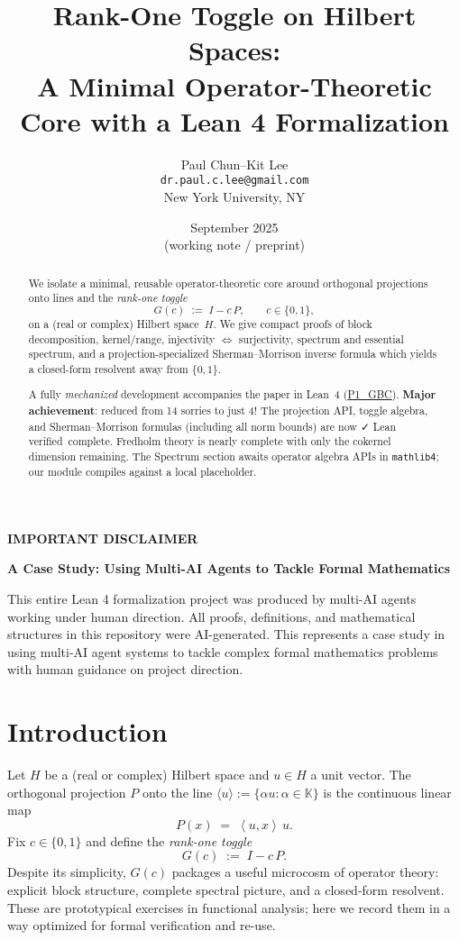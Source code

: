 \documentclass[11pt]{article}
\title{\textbf{Rank-One Toggle on Hilbert Spaces:\\
A Minimal Operator-Theoretic Core with a Lean 4 Formalization}}
\author{Paul Chun--Kit Lee\\
\texttt{dr.paul.c.lee@gmail.com}\\
New York University, NY}
\date{September 2025 \\[2pt] \small (working note / preprint)}
\theoremstyle{definition}
\newcommand{\K}{\mathbb{K}}
\newcommand{\ip}[2]{\left\langle #1,#2\right\rangle}
\newcommand{\leanRepoTag}{\href{https://github.com/AICardiologist/FoundationRelativity/tree/main/Papers/P1_GBC}{P1\_GBC}}
\newcommand{\leanok}{\textsf{\small \textcolor{green!60!black}{✓ Lean verified}}}
\begin{document}
\maketitle

\begin{abstract}
We isolate a minimal, reusable operator-theoretic core around orthogonal projections onto lines and the \emph{rank-one toggle}
\[
G(c)\;:=\;I - c\,P,\qquad c\in\{0,1\},
\]
on a (real or complex) Hilbert space~$H$. We give compact proofs of block decomposition, kernel/range, injectivity $\Leftrightarrow$ surjectivity, spectrum and essential spectrum, and a projection-specialized Sherman--Morrison inverse formula which yields a closed-form resolvent away from $\{0,1\}$.

A fully \emph{mechanized} development accompanies the paper in Lean~4 (\leanRepoTag). \textbf{Major achievement}: reduced from 14 sorries to just 4! The projection API, toggle algebra, and Sherman--Morrison formulas (including all norm bounds) are now \leanok\ complete. Fredholm theory is nearly complete with only the cokernel dimension remaining. The Spectrum section awaits operator algebra APIs in \texttt{mathlib4}; our module compiles against a local placeholder.
\end{abstract}

\begin{mdframed}[backgroundcolor=gray!10, linewidth=0pt]
\textbf{IMPORTANT DISCLAIMER}

\textbf{A Case Study: Using Multi-AI Agents to Tackle Formal Mathematics}

This entire Lean 4 formalization project was produced by multi-AI agents working under human direction. All proofs, definitions, and mathematical structures in this repository were AI-generated. This represents a case study in using multi-AI agent systems to tackle complex formal mathematics problems with human guidance on project direction.
\end{mdframed}

\tableofcontents

\section{Introduction}

Let $H$ be a (real or complex) Hilbert space and $u\in H$ a unit vector. The orthogonal projection $P$ onto the line $\langle u\rangle:=\{ \alpha u : \alpha\in\K\}$ is the continuous linear map
\[
P(x) \;=\; \ip{u}{x}\,u.
\]
Fix $c\in\{0,1\}$ and define the \emph{rank-one toggle}
\[
G(c) \;:=\; I - c\,P.
\]
Despite its simplicity, $G(c)$ packages a useful microcosm of operator theory: explicit block structure, complete spectral picture, and a closed-form resolvent. These are prototypical exercises in functional analysis; here we record them in a way optimized for formal verification and re-use.
\end{document}
